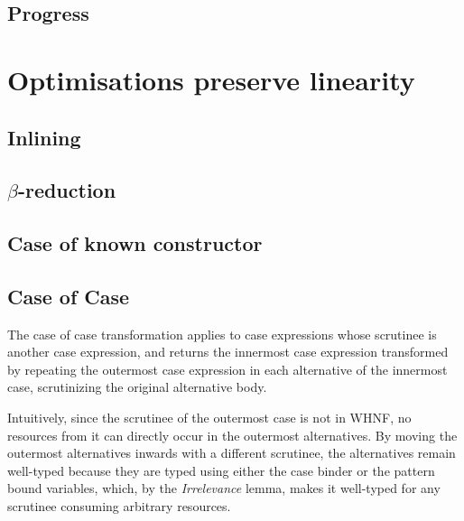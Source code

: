 \documentclass[acmsmall,review,anonymous]{acmart}
\begin{document}
\subsection{Progress\label{sec:proof:progress}}







\section{Optimisations preserve linearity}\label{app:optimisations}

\subsection{Inlining}


\subsection{\texorpdfstring{$\beta$}{Beta}-reduction}



\subsection{Case of known constructor}



\subsection{Case of Case\label{sec:proof:caseofcase}}

The case of case transformation applies to case expressions whose scrutinee is
another case expression, and returns the innermost case expression transformed by repeating
the outermost case expression in each alternative of the innermost case,
scrutinizing the original alternative body.

Intuitively, since the scrutinee of the outermost case is not in WHNF, no
resources from it can directly occur in the outermost alternatives. By moving
the outermost alternatives inwards with a different scrutinee, the alternatives
remain well-typed because they are typed using either the case binder or the
pattern bound variables, which, by the \emph{Irrelevance} lemma, makes it
well-typed for any scrutinee consuming arbitrary resources.
\end{document}
